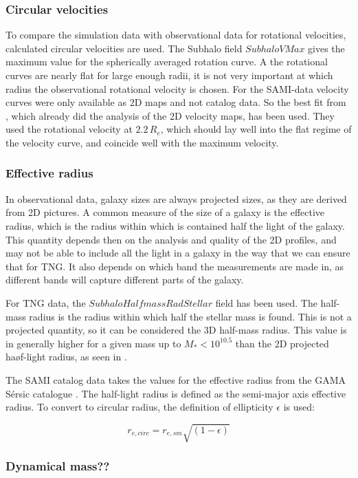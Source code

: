 \subsubsection{Circular velocities}
To compare the simulation data with observational data for rotational velocities, calculated circular velocities are used. The Subhalo field $SubhaloVMax$ gives the maximum value for the spherically averaged rotation curve. A the rotational curves are nearly flat for large enough radii, it is not very important at which radius the observational rotational velocity is chosen. For the SAMI-data velocity curves were only available as 2D maps and not catalog data. So the best fit from \parencite{Bloom2017}, which already did the analysis of the 2D velocity maps, has been used. They used the rotational velocity at $2.2\, R_e$, which should lay well into the flat regime of the velocity curve, and coincide well with the maximum velocity.

\subsubsection{Effective radius}
In observational data, galaxy sizes are always projected sizes, as they are derived from 2D pictures. A common measure of the size of a galaxy is the effective radius, which is the radius within which is contained half the light of the galaxy. This quantity depends then on the analysis and quality of the 2D profiles, and may not be able to include all the light in a galaxy in the way that we can ensure that for TNG. It also depends on which band the measurements are made in, as different bands will capture different parts of the galaxy.

For TNG data, the $SubhaloHalfmassRadStellar$ field has been used. The half-mass radius is the radius within which half the stellar mass is found. This is not a projected quantity, so it can be considered the 3D half-mass radius. This value is in generally higher for a given mass up to $M_{*} < 10^10.5$ than the 2D projected haøf-light radius, as seen in \parencite{Genel2017}.

The SAMI catalog data takes the values for the effective radius from the GAMA Sérsic catalogue \parencite{Kelvin2012}. The half-light radius is defined as the semi-major axis effective radius. To convert to circular radius, the definition of ellipticity $\epsilon$ is used:

\begin{equation}
   r_{e, circ} = r_{e,sm}\sqrt{(1-\epsilon)}
\end{equation}



\subsubsection{Dynamical mass??}